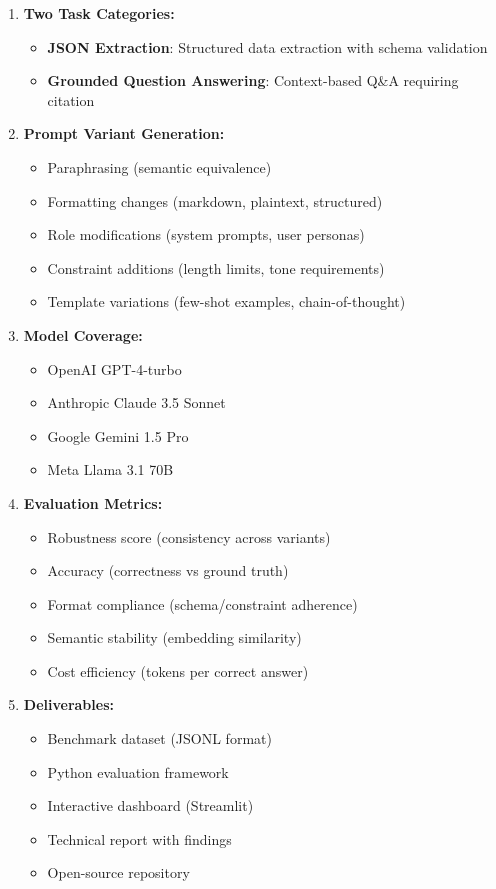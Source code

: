 \documentclass[11pt,a4paper]{article}
\begin{document}
\begin{enumerate}[leftmargin=*]
    \item \textbf{Two Task Categories:}
    \begin{itemize}
        \item \textbf{JSON Extraction}: Structured data extraction with schema validation
        \item \textbf{Grounded Question Answering}: Context-based Q\&A requiring citation
    \end{itemize}
    
    \item \textbf{Prompt Variant Generation:}
    \begin{itemize}
        \item Paraphrasing (semantic equivalence)
        \item Formatting changes (markdown, plaintext, structured)
        \item Role modifications (system prompts, user personas)
        \item Constraint additions (length limits, tone requirements)
        \item Template variations (few-shot examples, chain-of-thought)
    \end{itemize}
    
    \item \textbf{Model Coverage:}
    \begin{itemize}
        \item OpenAI GPT-4-turbo
        \item Anthropic Claude 3.5 Sonnet
        \item Google Gemini 1.5 Pro
        \item Meta Llama 3.1 70B
    \end{itemize}
    
    \item \textbf{Evaluation Metrics:}
    \begin{itemize}
        \item Robustness score (consistency across variants)
        \item Accuracy (correctness vs ground truth)
        \item Format compliance (schema/constraint adherence)
        \item Semantic stability (embedding similarity)
        \item Cost efficiency (tokens per correct answer)
    \end{itemize}
    
    \item \textbf{Deliverables:}
    \begin{itemize}
        \item Benchmark dataset (JSONL format)
        \item Python evaluation framework
        \item Interactive dashboard (Streamlit)
        \item Technical report with findings
        \item Open-source repository
    \end{itemize}
\end{enumerate}
\end{document}
